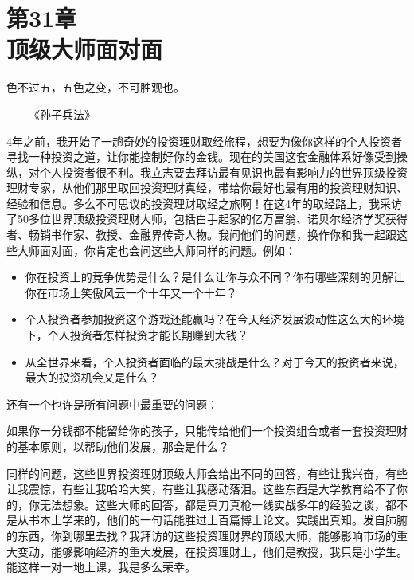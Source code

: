 
\section[第31章\q 顶级大师面对面]{第31章\\ 顶级大师面对面}

\begin{BookQuote}
色不过五，五色之变，不可胜观也。

\hfill ——《孙子兵法》
\end{BookQuote}

4年之前，我开始了一趟奇妙的投资理财取经旅程，想要为像你这样的个人投资者寻找一种投资之道，让你能控制好你的金钱。现在的美国这套金融体系好像受到操纵，对个人投资者很不利。我立志要去拜访最有见识也最有影响力的世界顶级投资理财专家，从他们那里取回投资理财真经，带给你最好也最有用的投资理财知识、经验和信息。多么不可思议的投资理财取经之旅啊！在这4年的取经路上，我采访了50多位世界顶级投资理财大师，包括白手起家的亿万富翁、诺贝尔经济学奖获得者、畅销书作家、教授、金融界传奇人物。我问他们的问题，换作你和我一起跟这些大师面对面，你肯定也会问这些大师同样的问题。例如：

\begin{itemize}
\item 你在投资上的竞争优势是什么？是什么让你与众不同？你有哪些深刻的见解让你在市场上笑傲风云一个十年又一个十年？
\item 个人投资者参加投资这个游戏还能赢吗？在今天经济发展波动性这么大的环境下，个人投资者怎样投资才能长期赚到大钱？
\item 从全世界来看，个人投资者面临的最大挑战是什么？对于今天的投资者来说，最大的投资机会又是什么？
\end{itemize}

还有一个也许是所有问题中最重要的问题：

如果你一分钱都不能留给你的孩子，只能传给他们一个投资组合或者一套投资理财的基本原则，以帮助他们发展，那会是什么？

同样的问题，这些世界投资理财顶级大师会给出不同的回答，有些让我兴奋，有些让我震惊，有些让我哈哈大笑，有些让我感动落泪。这些东西是大学教育给不了你的，你无法想象。这些大师的回答，都是真刀真枪一线实战多年的经验之谈，都不是从书本上学来的，他们的一句话能胜过上百篇博士论文。实践出真知。发自肺腑的东西，你到哪里去找？我拜访的这些投资理财界的顶级大师，能够影响市场的重大变动，能够影响经济的重大发展，在投资理财上，他们是教授，我只是小学生。能这样一对一地上课，我是多么荣幸。

